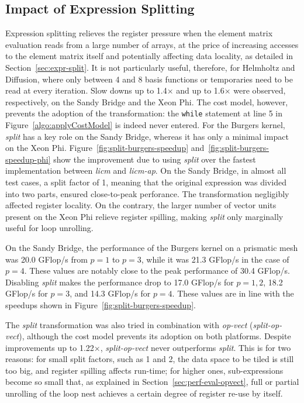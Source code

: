 \documentclass[conference]{IEEEtran}
\begin{document}

\subsection{Impact of Expression Splitting}
\label{sec:perf-results-split}
Expression splitting relieves the register pressure when the element matrix evaluation reads from a large number of arrays, at the price of increasing accesses to the element matrix itself and potentially affecting data locality, as detailed in Section~\ref{sec:expr-split}. It is not particularly useful, therefore, for Helmholtz and Diffusion, where only between 4 and 8 basis functions or temporaries need to be read at every iteration. Slow downs up to 1.4$\times$ and up to 1.6$\times$ were observed, respectively, on the Sandy Bridge and the Xeon Phi. The cost model, however, prevents the adoption of the transformation: the \texttt{while} statement at line 5 in Figure~\ref{algo:applyCostModel} is indeed never entered. For the Burgers kernel, \emph{split} has a key role on the Sandy Bridge, whereas it has only a minimal impact on the Xeon Phi. Figure~\ref{fig:split-burgers-speedup} and~\ref{fig:split-burgers-speedup-phi} show the improvement due to using \emph{split} over the fastest implementation between \emph{licm} and \emph{licm-ap}. On the Sandy Bridge, in almost all test cases, a split factor of 1, meaning that the original expression was divided into two parts, ensured close-to-peak perforance. The transformation negligibly affected register locality. On the contrary, the larger number of vector units present on the Xeon Phi relieve register spilling, making \emph{split} only marginally useful for loop unrolling. 

On the Sandy Bridge, the performance of the Burgers kernel on a prismatic mesh was 20.0 GFlop/s from $p=1$ to $p=3$, while it was 21.3 GFlop/s in the case of $p=4$. These values are notably close to the peak performance of 30.4 GFlop/s. Disabling \emph{split} makes the performance drop to 17.0 GFlop/s for $p=1, 2$, 18.2 GFlop/s for $p=3$, and 14.3 GFlop/s for $p=4$. These values are in line with the speedups shown in Figure~\ref{fig:split-burgers-speedup}. 

The \emph{split} transformation was also tried in combination with \emph{op-vect} (\emph{split-op-vect}), although the cost model prevents its adoption on both platforms. Despite improvements up to 1.22$\times$, \emph{split-op-vect} never outperforms \emph{split}. This is for two reasons: for small split factors, such as 1 and 2, the data space to be tiled is still too big, and register spilling affects run-time; for higher ones, sub-expressions become so small that, as explained in Section~\ref{sec:perf-eval-opvect}, full or partial unrolling of the loop nest achieves a certain degree of register re-use by itself.
\end{document}
